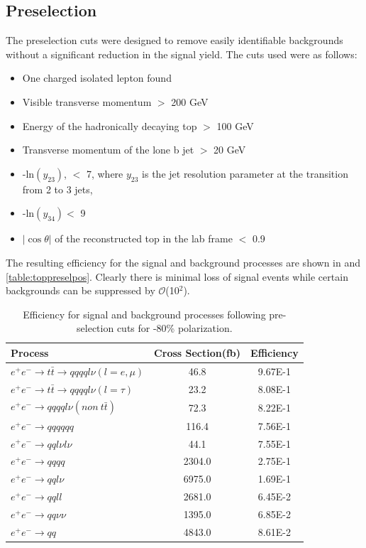 \subsection{Preselection}

The preselection cuts were designed to remove easily identifiable backgrounds without a significant reduction in the signal yield. The cuts used were as follows:

\begin{itemize}
\item One charged isolated lepton found
\item Visible transverse momentum $>$ 200 GeV
\item Energy of the hadronically decaying top $>$ 100 GeV
\item Transverse momentum of the lone b jet $>$ 20 GeV
\item -ln$(y_{23})$, $<$ 7, where $y_{23}$ is the jet resolution parameter at the transition from 2 to 3 jets,
\item -ln$(y_{34}) <$ 9
\item $|\cos\theta|$ of the reconstructed top in the lab frame $<$ 0.9
\end{itemize}

The resulting efficiency for the signal and background processes are shown in  and \ref{table:toppreselpos}. Clearly there is minimal loss of signal events while certain backgrounds can be suppressed by $\mathcal{O}$(10$^2$).

\begin{table}
  \centering
  \begin{tabular}{l | c | c }
    \toprule
    Process     & Cross Section(fb) & Efficiency  \\
     \midrule
     $e^+e^-\rightarrow t\bar{t} \rightarrow qqqql\nu (l=e,\mu)$& 46.8 & 9.67E-1 \\
    \midrule
    $e^+e^-\rightarrow t\bar{t} \rightarrow qqqql\nu (l=\tau)$& 23.2 & 8.08E-1 \\
    \midrule
    $e^+e^-\rightarrow qqqql\nu (non ~ t\bar{t})$& 72.3 & 8.22E-1\\
    \midrule
    $e^+e^-\rightarrow qqqqqq$ & 116.4 &  7.56E-1\\
    \midrule
    $e^+e^-\rightarrow qql\nu l\nu$ & 44.1 &  7.55E-1\\
    \midrule
    $e^+e^-\rightarrow qqqq$ & 2304.0 &  2.75E-1\\
    \midrule
    $e^+e^-\rightarrow qql\nu$ & 6975.0 &  1.69E-1\\
    \midrule
    $e^+e^-\rightarrow qqll$ & 2681.0 &  6.45E-2\\
    \midrule
    $e^+e^-\rightarrow qq\nu\nu$ & 1395.0 &  6.85E-2\\
    \midrule
    $e^+e^-\rightarrow qq$ & 4843.0 & 8.61E-2\\
    \bottomrule
  \end{tabular}
  \caption{Efficiency for signal and background processes following pre-selection cuts for -80\% polarization.}
  \label{table:toppreselneg}
\end{table}

